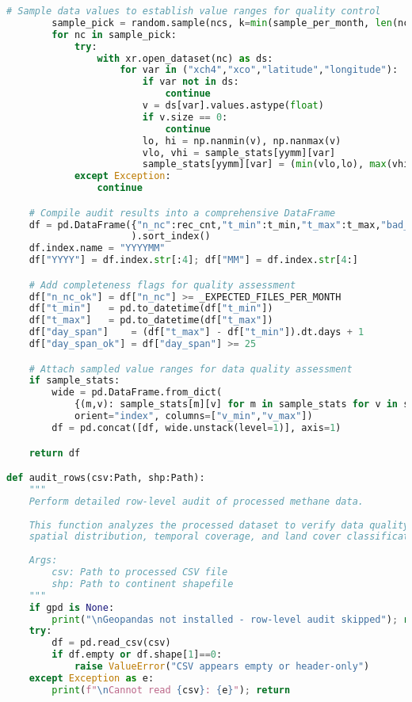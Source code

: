\begin{lstlisting}[language=Python, caption=Dataset Health Check Algorithm, label=alg:step05_health_check]
        # Sample data values to establish value ranges for quality control
        sample_pick = random.sample(ncs, k=min(sample_per_month, len(ncs)))
        for nc in sample_pick:
            try:
                with xr.open_dataset(nc) as ds:
                    for var in ("xch4","xco","latitude","longitude"):
                        if var not in ds:
                            continue
                        v = ds[var].values.astype(float)
                        if v.size == 0:
                            continue
                        lo, hi = np.nanmin(v), np.nanmax(v)
                        vlo, vhi = sample_stats[yymm][var]
                        sample_stats[yymm][var] = (min(vlo,lo), max(vhi,hi))
            except Exception:
                continue

    # Compile audit results into a comprehensive DataFrame
    df = pd.DataFrame({"n_nc":rec_cnt,"t_min":t_min,"t_max":t_max,"bad_ts":bad_ts}
                      ).sort_index()
    df.index.name = "YYYYMM"
    df["YYYY"] = df.index.str[:4]; df["MM"] = df.index.str[4:]

    # Add completeness flags for quality assessment
    df["n_nc_ok"] = df["n_nc"] >= _EXPECTED_FILES_PER_MONTH
    df["t_min"]   = pd.to_datetime(df["t_min"])
    df["t_max"]   = pd.to_datetime(df["t_max"])
    df["day_span"]    = (df["t_max"] - df["t_min"]).dt.days + 1
    df["day_span_ok"] = df["day_span"] >= 25

    # Attach sampled value ranges for data quality assessment
    if sample_stats:
        wide = pd.DataFrame.from_dict(
            {(m,v): sample_stats[m][v] for m in sample_stats for v in sample_stats[m]},
            orient="index", columns=["v_min","v_max"])
        df = pd.concat([df, wide.unstack(level=1)], axis=1)

    return df

def audit_rows(csv:Path, shp:Path):
    """
    Perform detailed row-level audit of processed methane data.
    
    This function analyzes the processed dataset to verify data quality,
    spatial distribution, temporal coverage, and land cover classification.
    
    Args:
        csv: Path to processed CSV file
        shp: Path to continent shapefile
    """
    if gpd is None:
        print("\nGeopandas not installed - row-level audit skipped"); return
    try:
        df = pd.read_csv(csv)
        if df.empty or df.shape[1]==0:
            raise ValueError("CSV appears empty or header-only")
    except Exception as e:
        print(f"\nCannot read {csv}: {e}"); return


\end{lstlisting}
